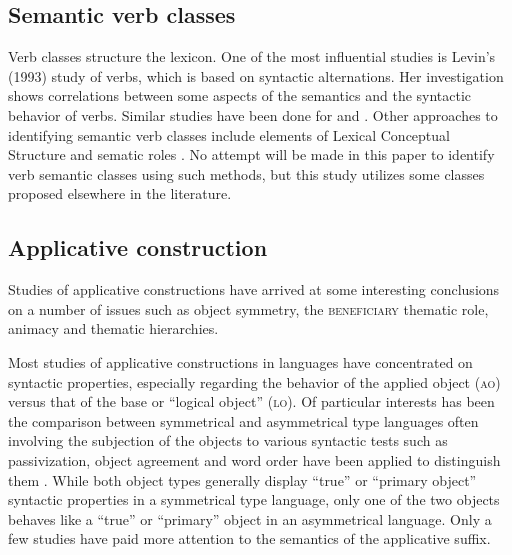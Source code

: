 \documentclass[output=paper]{langsci/langscibook}
\begin{document}
\subsection{Semantic verb classes}\label{sec:sibanda:2.2}

Verb classes structure the lexicon. One of the most influential studies is Levin’s (1993) study of  verbs, which is based on syntactic alternations. Her investigation shows correlations between some aspects of the semantics and the syntactic behavior of  verbs. Similar studies have been done for  \citep{VazquezEtAl2000} and  \citep{Schumacher1986,SchulteimWaldeBrew2002}. Other approaches to identifying semantic verb classes include elements of Lexical Conceptual Structure \citep{Gruber1965,Jackendoff1983,Jackendoff1990} and sematic roles \citep{Chafe1970,Cook1979,Longacre1976,FoleyVanValin1984,VanValin1993}. No attempt will be made in this paper to identify  verb semantic classes using such methods, but this study utilizes some classes proposed elsewhere in the literature.

\subsection{Applicative construction} \label{sec:sibanda:2.3}

Studies of  applicative constructions have arrived at some interesting conclusions on a number of issues such as object symmetry, the \textsc{beneficiary} thematic role, animacy and thematic hierarchies. 

Most studies of applicative constructions in  languages have concentrated on syntactic properties, especially regarding the behavior of the applied object (\textsc{ao}) versus that of the base or “logical object” (\textsc{lo}). Of particular interests has been the comparison between symmetrical and asymmetrical type languages often involving the subjection of the objects to various syntactic tests such as passivization, object agreement and word order have been applied to distinguish them \citep{BresnanMoshi1990,NgonyaniGithinji2006,Pylkkanen2000,Machobane1989,AlsinaMchombo1993,Baker1988,Harford1993,Ngonyani1996}. While both object types generally display “true” or “primary object” syntactic properties in a symmetrical type language, only one of the two objects behaves like a “true” or “primary” object in an asymmetrical language. Only a few studies have paid more attention to the semantics of the applicative suffix. 
\end{document}
